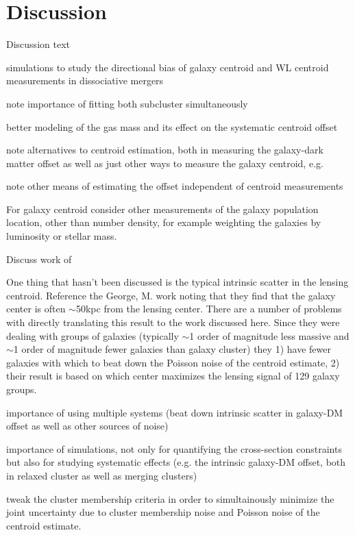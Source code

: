 \section{Discussion}

Discussion text

simulations to study the directional bias of galaxy centroid and WL centroid measurements in dissociative mergers


note importance of fitting both subcluster simultaneously

better modeling of the gas mass and its effect on the systematic centroid offset

note alternatives to centroid estimation, both in measuring the galaxy-dark matter offset as well as just other ways to measure the galaxy centroid, e.g. \citep{Randall:2008hs}

note other means of estimating the offset independent of centroid measurements

For galaxy centroid consider other measurements of the galaxy population location, other than number density, for example weighting the galaxies by luminosity or stellar mass.

Discuss work of \citep{Kahlhoefer:2013wp}

One thing that hasn't been discussed is the typical intrinsic scatter in the lensing centroid. Reference the George, M. work noting that they find that the galaxy center is often $\sim$50kpc from the lensing center. There are a number of problems with directly translating this result to the work discussed here. Since they were dealing with groups of galaxies (typically $\sim$1 order of magnitude less massive and $\sim$1 order of magnitude fewer galaxies than galaxy cluster) they 1) have fewer galaxies with which to beat down the Poisson noise of the centroid estimate, 2) their result is based on which center maximizes the lensing signal of 129 galaxy groups. 

importance of using multiple systems (beat down intrinsic scatter in galaxy-DM offset as well as other sources of noise)

importance of simulations, not only for quantifying the cross-section constraints but also for studying systematic effects (e.g. the intrinsic galaxy-DM offset, both in relaxed cluster as well as merging clusters)

tweak the cluster membership criteria in order to simultainously minimize the joint uncertainty due to cluster membership noise and Poisson noise of the centroid estimate.

